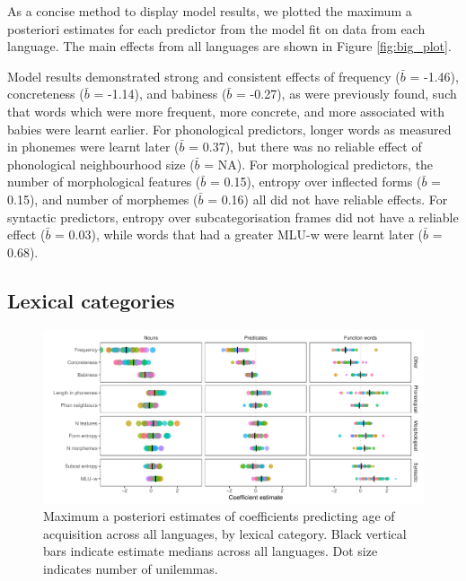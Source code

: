\documentclass[10pt, letterpaper]{article}
\newenvironment{CodeChunk}{}{}
\begin{document}
As a concise method to display model results, we plotted the maximum a
posteriori estimates for each predictor from the model fit on data from
each language. The main effects from all languages are shown in Figure
\ref{fig:big_plot}.

Model results demonstrated strong and consistent effects of frequency
(\(\bar{b}\) = -1.46), concreteness (\(\bar{b}\) = -1.14), and babiness
(\(\bar{b}\) = -0.27), as were previously found, such that words which
were more frequent, more concrete, and more associated with babies were
learnt earlier. For phonological predictors, longer words as measured in
phonemes were learnt later (\(\bar{b}\) = 0.37), but there was no
reliable effect of phonological neighbourhood size (\(\bar{b}\) = NA).
For morphological predictors, the number of morphological features
(\(\bar{b}\) = 0.15), entropy over inflected forms (\(\bar{b}\) = 0.15),
and number of morphemes (\(\bar{b}\) = 0.16) all did not have reliable
effects. For syntactic predictors, entropy over subcategorisation frames
did not have a reliable effect (\(\bar{b}\) = 0.03), while words that
had a greater MLU-w were learnt later (\(\bar{b}\) = 0.68).

\hypertarget{lexical-categories}{%
\subsection{Lexical categories}\label{lexical-categories}}

\begin{CodeChunk}
\begin{figure}[ht]

{\centering \includegraphics[width=500px]{figs/lc_plot-1} 

}

\caption[Maximum a posteriori estimates of coefficients predicting age of acquisition across all languages, by lexical category]{Maximum a posteriori estimates of coefficients predicting age of acquisition across all languages, by lexical category. Black vertical bars indicate estimate medians across all languages. Dot size indicates number of unilemmas.}\label{fig:lc_plot}
\end{figure}
\end{CodeChunk}
\end{document}
